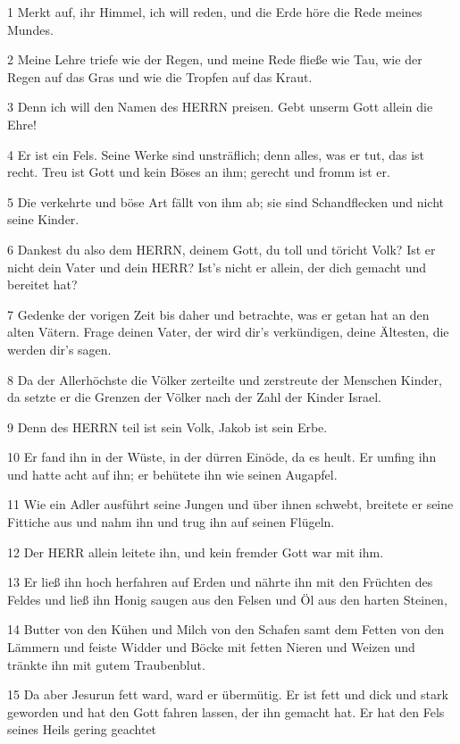 \par 1 Merkt auf, ihr Himmel, ich will reden, und die Erde höre die Rede meines Mundes.
\par 2 Meine Lehre triefe wie der Regen, und meine Rede fließe wie Tau, wie der Regen auf das Gras und wie die Tropfen auf das Kraut.
\par 3 Denn ich will den Namen des HERRN preisen. Gebt unserm Gott allein die Ehre!
\par 4 Er ist ein Fels. Seine Werke sind unsträflich; denn alles, was er tut, das ist recht. Treu ist Gott und kein Böses an ihm; gerecht und fromm ist er.
\par 5 Die verkehrte und böse Art fällt von ihm ab; sie sind Schandflecken und nicht seine Kinder.
\par 6 Dankest du also dem HERRN, deinem Gott, du toll und töricht Volk? Ist er nicht dein Vater und dein HERR? Ist's nicht er allein, der dich gemacht und bereitet hat?
\par 7 Gedenke der vorigen Zeit bis daher und betrachte, was er getan hat an den alten Vätern. Frage deinen Vater, der wird dir's verkündigen, deine Ältesten, die werden dir's sagen.
\par 8 Da der Allerhöchste die Völker zerteilte und zerstreute der Menschen Kinder, da setzte er die Grenzen der Völker nach der Zahl der Kinder Israel.
\par 9 Denn des HERRN teil ist sein Volk, Jakob ist sein Erbe.
\par 10 Er fand ihn in der Wüste, in der dürren Einöde, da es heult. Er umfing ihn und hatte acht auf ihn; er behütete ihn wie seinen Augapfel.
\par 11 Wie ein Adler ausführt seine Jungen und über ihnen schwebt, breitete er seine Fittiche aus und nahm ihn und trug ihn auf seinen Flügeln.
\par 12 Der HERR allein leitete ihn, und kein fremder Gott war mit ihm.
\par 13 Er ließ ihn hoch herfahren auf Erden und nährte ihn mit den Früchten des Feldes und ließ ihn Honig saugen aus den Felsen und Öl aus den harten Steinen,
\par 14 Butter von den Kühen und Milch von den Schafen samt dem Fetten von den Lämmern und feiste Widder und Böcke mit fetten Nieren und Weizen und tränkte ihn mit gutem Traubenblut.
\par 15 Da aber Jesurun fett ward, ward er übermütig. Er ist fett und dick und stark geworden und hat den Gott fahren lassen, der ihn gemacht hat. Er hat den Fels seines Heils gering geachtet
